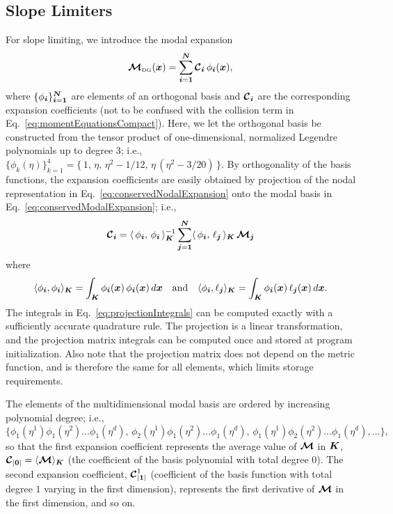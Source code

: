 \documentclass[10pt,preprint]{aastex}
\begin{document}
\subsection{Slope Limiters}
\label{sec:slopeLimiters}

For slope limiting, we introduce the modal expansion
\begin{equation}
  \boldsymbol{\mathcal{M}}_{\mbox{\tiny DG}}(\boldsymbol{x})=\sum_{\boldsymbol{i}=\boldsymbol{1}}^{\boldsymbol{N}}\boldsymbol{\mathcal{C}}_{\boldsymbol{i}}\,\phi_{\boldsymbol{i}}(\boldsymbol{x}),
  \label{eq:conservedModalExpansion}
\end{equation}
where $\{\phi_{\boldsymbol{i}}\}_{\boldsymbol{i}=\boldsymbol{1}}^{\boldsymbol{N}}$ are elements of an orthogonal basis and $\boldsymbol{\mathcal{C}}_{\boldsymbol{i}}$ are the corresponding expansion coefficients (not to be confused with the collision term in Eq.~\eqref{eq:momentEquationsCompact}).  
Here, we let the orthogonal basis be constructed from the tensor product of one-dimensional, normalized Legendre polynomials up to degree 3; i.e., $\{\phi_{k}(\eta)\}_{k=1}^{4}=\{\,1,\,\eta,\,\eta^{2}-1/12,\,\eta\,(\eta^{2}-3/20)\,\}$.  
By orthogonality of the basis functions, the expansion coefficients are easily obtained by projection of the nodal representation in Eq.~\eqref{eq:conservedNodalExpansion} onto the modal basis in Eq.~\eqref{eq:conservedModalExpansion}; i.e.,
\begin{equation}
  \boldsymbol{\mathcal{C}}_{\boldsymbol{i}}
  =\langle\,\phi_{\boldsymbol{i}},\,\phi_{\boldsymbol{i}}\,\rangle_{\boldsymbol{K}}^{-1}\sum_{\boldsymbol{j}=\boldsymbol{1}}^{\boldsymbol{N}}\langle\,\phi_{\boldsymbol{i}},\,\ell_{\boldsymbol{j}}\,\rangle_{\boldsymbol{K}}\,\boldsymbol{\mathcal{M}}_{\boldsymbol{j}}
\end{equation}
where
\begin{equation}
  \langle\phi_{\boldsymbol{i}},\phi_{\boldsymbol{i}}\rangle_{\boldsymbol{K}}=\int_{\boldsymbol{K}}\phi_{\boldsymbol{i}}(\boldsymbol{x})\,\phi_{\boldsymbol{i}}(\boldsymbol{x})\,d\boldsymbol{x}
  \quad\text{and}\quad
  \langle\phi_{\boldsymbol{i}},\ell_{\boldsymbol{j}}\rangle_{\boldsymbol{K}}=\int_{\boldsymbol{K}}\phi_{\boldsymbol{i}}(\boldsymbol{x})\,\ell_{\boldsymbol{j}}(\boldsymbol{x})\,d\boldsymbol{x}.
  \label{eq:projectionIntegrals}
\end{equation}
The integrals in Eq.~\eqref{eq:projectionIntegrals} can be computed exactly with a sufficiently accurate quadrature rule.  
The projection is a linear transformation, and the projection matrix integrals can be computed once and stored at program initialization.  
Also note that the projection matrix does not depend on the metric function, and is therefore the same for all elements, which limits storage requirements.  

The elements of the multidimensional modal basis are ordered by increasing polynomial degree; i.e., 
\begin{equation}
  \{\phi_{1}(\eta^{1})\phi_{1}(\eta^{2})\ldots\phi_{1}(\eta^{d}),\,\phi_{2}(\eta^{1})\phi_{1}(\eta^{2})\ldots\phi_{1}(\eta^{d}),\,\phi_{1}(\eta^{1})\phi_{2}(\eta^{2})\ldots\phi_{1}(\eta^{d}),\ldots\},
\end{equation}
so that the first expansion coefficient represents the average value of $\boldsymbol{\mathcal{M}}$ in $\boldsymbol{K}$, $\boldsymbol{\mathcal{C}}_{|\boldsymbol{0}|}=\langle\boldsymbol{\mathcal{M}}\rangle_{\boldsymbol{K}}$ (the coefficient of the basis polynomial with total degree $0$).  
The second expansion coefficient, $\boldsymbol{\mathcal{C}}_{|\boldsymbol{1}|}^{1}$ (coefficient of the basis function with total degree $1$ varying in the first dimension), represents the first derivative of $\boldsymbol{\mathcal{M}}$ in the first dimension, and so on.  
\end{document}
